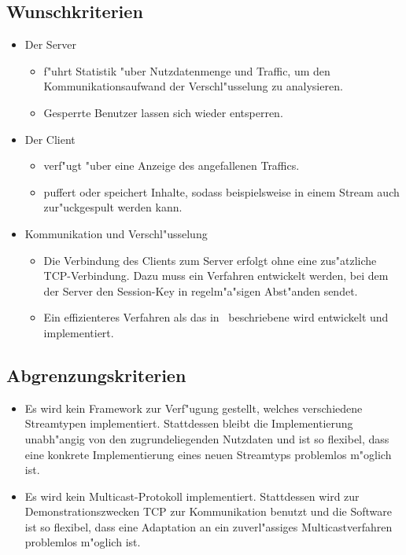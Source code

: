 \documentclass[a4paper,10pt]{scrartcl}
\begin{document}
\subsection{Wunschkriterien}

\begin{itemize}

\item Der Server
\begin{itemize}
   \item f"uhrt Statistik "uber Nutzdatenmenge und Traffic, um den Kommunikationsaufwand
         der Verschl"usselung zu analysieren.
   \item Gesperrte Benutzer lassen sich wieder entsperren.
\end{itemize}

\item Der Client
\begin{itemize}
   \item verf"ugt "uber eine Anzeige des angefallenen Traffics.
   \item puffert oder speichert Inhalte, sodass beispielsweise in einem Stream auch
         zur"uckgespult werden kann.
\end{itemize}

\item Kommunikation und Verschl"usselung
\begin{itemize}
   \item Die Verbindung des Clients zum Server erfolgt ohne eine zus"atzliche TCP-Verbindung.
         Dazu muss ein Verfahren entwickelt werden, bei dem der Server den Session-Key
         in regelm"a"sigen Abst"anden sendet.
   \item Ein effizienteres Verfahren als das in~\cite{Naor00} beschriebene wird
         entwickelt und implementiert.
\end{itemize}
\end{itemize}

\subsection{Abgrenzungskriterien}
\begin{itemize}
   \item Es wird kein Framework zur Verf"ugung gestellt, welches verschiedene
         Streamtypen implementiert. Stattdessen bleibt die Implementierung
         unabh"angig von den zugrundeliegenden Nutzdaten und ist so flexibel,
         dass eine konkrete Implementierung eines neuen Streamtyps problemlos
         m"oglich ist.
   \item Es wird kein Multicast-Protokoll implementiert. Stattdessen wird
         zur Demonstrationszwecken TCP zur Kommunikation benutzt und die Software
         ist so flexibel, dass eine Adaptation an ein zuverl"assiges
         Multicastverfahren problemlos m"oglich ist.
\end{itemize}
\end{document}

